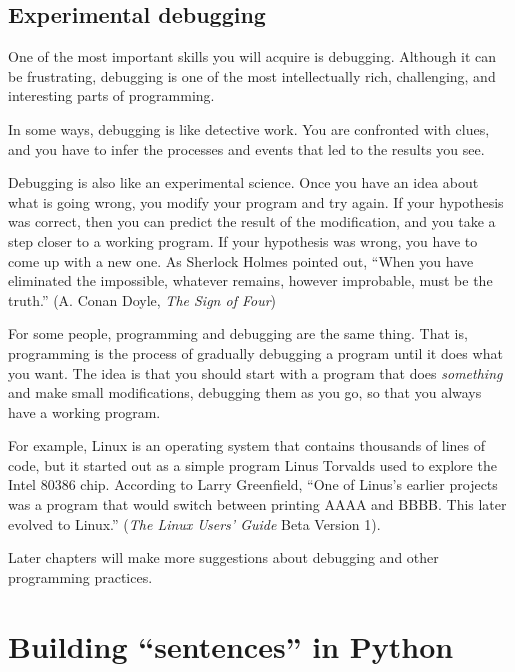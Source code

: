 \documentclass[10pt]{book}
\begin{document}
\subsection{Experimental debugging}

One of the most important skills you will acquire is debugging.
Although it can be frustrating, debugging is one of the most
intellectually rich, challenging, and interesting parts of
programming.


In some ways, debugging is like detective work.  You are confronted
with clues, and you have to infer the processes and events that led
to the results you see.

Debugging is also like an experimental science.  Once you have an idea
about what is going wrong, you modify your program and try again.  If
your hypothesis was correct, then you can predict the result of the
modification, and you take a step closer to a working program.  If
your hypothesis was wrong, you have to come up with a new one.  As
Sherlock Holmes pointed out, ``When you have eliminated the
impossible, whatever remains, however improbable, must be the truth.''
(A. Conan Doyle, \emph{The Sign of Four})


For some people, programming and debugging are the same thing.  That
is, programming is the process of gradually debugging a program until
it does what you want.  The idea is that you should start with a
program that does \emph{something} and make small modifications,
debugging them as you go, so that you always have a working program.

For example, Linux is an operating system that contains thousands of
lines of code, but it started out as a simple program Linus Torvalds
used to explore the Intel 80386 chip.  According to Larry Greenfield,
``One of Linus's earlier projects was a program that would switch
between printing AAAA and BBBB.  This later evolved to Linux.''
(\emph{The Linux Users' Guide} Beta Version 1).


Later chapters will make more suggestions about debugging and other
programming practices.

\section{Building ``sentences'' in Python}
\end{document}
